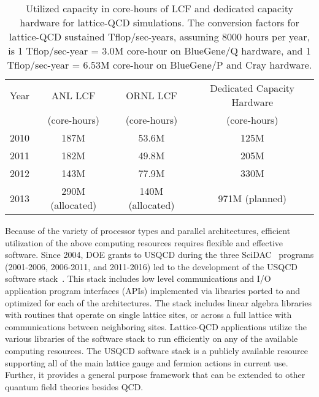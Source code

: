 \begin{table}[t]
\begin{center}
\caption{Utilized capacity in core-hours of LCF and dedicated capacity
hardware for lattice-QCD simulations.  The conversion factors for lattice-QCD
sustained Tflop/sec-years, assuming 8000 hours per year, is 1 Tflop/sec-year =
3.0M core-hour on BlueGene/Q hardware, and 1 Tflop/sec-year = 6.53M core-hour
on BlueGene/P and Cray hardware.\vspace{1.5mm}}
\label{tab:current}
\begin{tabular}{lccc}  
\hline\hline
Year & ANL LCF & ORNL LCF & Dedicated Capacity Hardware \\[-0.75mm]
& (core-hours) & (core-hours) & (core-hours) \\[0.5mm]  \hline
2010 & 187M & 53.6M & 125M \\
2011 & 182M & 49.8M & 205M \\
2012 & 143M & 77.9M & 330M \\
2013 & 290M (allocated) & 140M (allocated) & 971M (planned) \\ \hline\hline
\end{tabular}
\end{center}
\end{table}

Because of the variety of processor types and parallel architectures,
efficient utilization of the above computing resources requires flexible and
effective software.  Since 2004, DOE grants to USQCD during the three
SciDAC~\cite{SciDAC} programs (2001-2006, 2006-2011, and 2011-2016) led to the
development of the USQCD software stack~\cite{SciDAC-software}.  This stack
includes low level communications and I/O application program interfaces
(APIs) implemented via libraries ported to and optimized for each of the
architectures.  The stack includes linear algebra libraries with routines that
operate on single lattice sites, or across a full lattice with communications
between neighboring sites.  Lattice-QCD applications utilize the various
libraries of the software stack to run efficiently on any of the available
computing resources.  The USQCD software stack is a publicly available
resource supporting all of the main lattice gauge and fermion actions in
current use.  Further, it provides a general purpose framework that can be
extended to other quantum field theories besides QCD.

